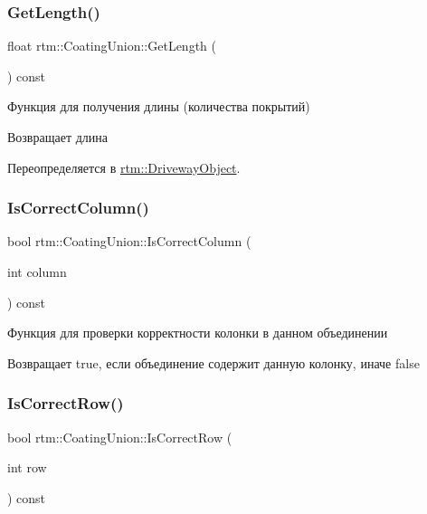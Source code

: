 \subsubsection{\texorpdfstring{Get\+Length()}{GetLength()}}
{\footnotesize\ttfamily float rtm\+::\+Coating\+Union\+::\+Get\+Length (\begin{DoxyParamCaption}{ }\end{DoxyParamCaption}) const\hspace{0.3cm}{\ttfamily [virtual]}}

Функция для получения длины (количества покрытий) \begin{DoxyReturn}{Возвращает}
длина 
\end{DoxyReturn}


Переопределяется в \hyperlink{classrtm_1_1_driveway_object_a5de41ef395ad8ccefb435e568f84ed40}{rtm\+::\+Driveway\+Object}.

\mbox{\label{classrtm_1_1_coating_union_a7f77378af1ea7473d10497ad01effcad}} 
\subsubsection{\texorpdfstring{Is\+Correct\+Column()}{IsCorrectColumn()}}
{\footnotesize\ttfamily bool rtm\+::\+Coating\+Union\+::\+Is\+Correct\+Column (\begin{DoxyParamCaption}\item[{int}]{column }\end{DoxyParamCaption}) const}

Функция для проверки корректности колонки в данном объединении \begin{DoxyReturn}{Возвращает}
true, если объединение содержит данную колонку, иначе false 
\end{DoxyReturn}
\mbox{\label{classrtm_1_1_coating_union_abbd51ea78ee3d798807827f6ee930540}} 
\subsubsection{\texorpdfstring{Is\+Correct\+Row()}{IsCorrectRow()}}
{\footnotesize\ttfamily bool rtm\+::\+Coating\+Union\+::\+Is\+Correct\+Row (\begin{DoxyParamCaption}\item[{int}]{row }\end{DoxyParamCaption}) const}


